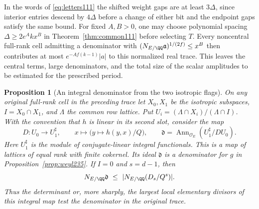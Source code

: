 \documentclass[a4paper,11pt]{article}
\newtheorem{proposition}{Proposition}[section]
\theoremstyle{definition}
\theoremstyle{remark}
\numberwithin{equation}{section}
\begin{document}
In the words of \eqref{eq:letters111} the shifted weight gaps
are at least \(3\Delta\), since interior entries descend by
\(4\Delta\) before a change of either bit and the endpoint gaps
satisfy the same bound. For fixed \(A,B>0\), one may choose
polynomial spacing \(\Delta\ge 2e^A kx^B\) in
Theorem~\ref{thm:common111} before selecting \(T\). Every
noncentral full-rank cell admitting a denominator with
\((N_{E/\QQ}\mathfrak a)^{1/(2f)}\le x^B\) then contributes at
most \(e^{-Af(k-1)}|a|\) to this normalized real trace.
This leaves the central terms, large denominators, and the total
size of the scalar amplitudes to be estimated for the
prescribed period.

\begin{proposition}[An integral denominator from the two isotropic flags]
\leavevmode\label{prop:denom235}
On any original full-rank cell in the preceding trace let
\(X_0,X_1\) be the isotropic subspaces, \(I=X_0\cap X_1\),
and \(\Lambda\) the common row lattice. Put
\(U_i=(\Lambda\cap X_i)/(\Lambda\cap I)\). With the convention
that \(h\) is linear in its second slot, consider the map
\[
 D:U_0\longrightarrow U_1^\sharp,\qquad
   x\longmapsto \bigl(y\longmapsto h(y,x)/Q\bigr),
 \qquad
 \mathfrak d=\operatorname{Ann}_{\mathcal O_E}
                      (U_1^\sharp/D U_0).
\]
Here \(U_1^\sharp\) is the module of conjugate-linear integral
functionals. This is a map of lattices of equal rank with finite
cokernel. Its ideal \(\mathfrak d\) is a denominator for \(g\)
in Proposition~\ref{prop:weyl235}. If \(I=0\) and
\(s=d-1\), then
\[
            N_{E/\QQ}\mathfrak d
                \ \le\ |N_{E/\QQ}(D_s/Q^s)|.
\]
Thus the determinant or, more sharply, the largest local
elementary divisors of this integral map test the denominator
in the original trace.
\end{proposition}
\end{document}
